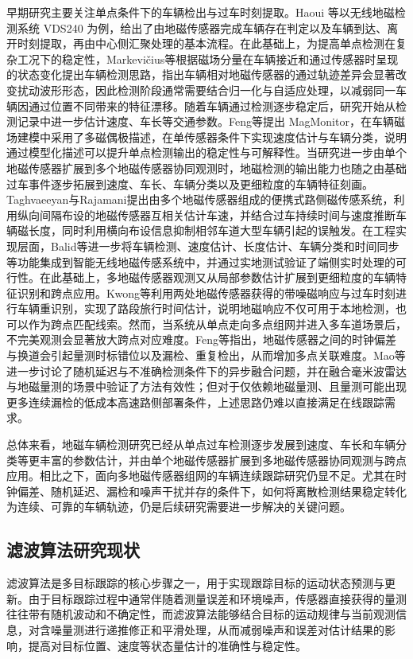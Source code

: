 \documentclass{xdupgthesis}
\begin{document}
早期研究主要关注单点条件下的车辆检出与过车时刻提取。Haoui 等以无线地磁检测系统 VDS240 为例，给出了由地磁传感器完成车辆存在判定以及车辆到达、离开时刻提取，再由中心侧汇聚处理的基本流程\cite{haoui2008wirelessmagnetic}。在此基础上，为提高单点检测在复杂工况下的稳定性，Markevičius等根据磁场分量在车辆接近和通过传感器时呈现的状态变化提出车辆检测思路，指出车辆相对地磁传感器的通过轨迹差异会显著改变扰动波形形态，因此检测阶段通常需要结合归一化与自适应处理，以减弱同一车辆因通过位置不同带来的特征漂移\cite{markevicius2016dynamic}。随着车辆通过检测逐步稳定后，研究开始从检测记录中进一步估计速度、车长等交通参数。Feng等提出 MagMonitor，在车辆磁场建模中采用了多磁偶极描述，在单传感器条件下实现速度估计与车辆分类，说明通过模型化描述可以提升单点检测输出的稳定性与可解释性\cite{feng2022magmonitor}。当研究进一步由单个地磁传感器扩展到多个地磁传感器协同观测时，地磁检测的输出能力也随之由基础过车事件逐步拓展到速度、车长、车辆分类以及更细粒度的车辆特征刻画。Taghvaeeyan与Rajamani提出由多个地磁传感器组成的便携式路侧磁传感系统，利用纵向间隔布设的地磁传感器互相关估计车速，并结合过车持续时间与速度推断车辆磁长度，同时利用横向布设信息抑制相邻车道大型车辆引起的误触发\cite{taghvaeeyan2014portable}。在工程实现层面，Balid等进一步将车辆检测、速度估计、长度估计、车辆分类和时间同步等功能集成到智能无线地磁传感系统中，并通过实地测试验证了端侧实时处理的可行性\cite{balid2018intelligent}。在此基础上，多地磁传感器观测又从局部参数估计扩展到更细粒度的车辆特征识别和跨点应用。Kwong等利用两处地磁传感器获得的带噪磁响应与过车时刻进行车辆重识别，实现了路段旅行时间估计，说明地磁响应不仅可用于本地检测，也可以作为跨点匹配线索\cite{kwong2009arterialtravel}。然而，当系统从单点走向多点组网并进入多车道场景后，不完美观测会显著放大跨点对应难度。Feng等指出，地磁传感器之间的时钟偏差与换道会引起量测时标错位以及漏检、重复检出，从而增加多点关联难度\cite{feng2021magneticdataassociation}。Mao等进一步讨论了随机延迟与不准确检测条件下的异步融合问题，并在融合毫米波雷达与地磁量测的场景中验证了方法有效性；但对于仅依赖地磁量测、且量测可能出现更多连续漏检的低成本高速路侧部署条件，上述思路仍难以直接满足在线跟踪需求\cite{mao2025asynchronousfusion}。 

总体来看，地磁车辆检测研究已经从单点过车检测逐步发展到速度、车长和车辆分类等更丰富的参数估计，并由单个地磁传感器扩展到多地磁传感器协同观测与跨点应用。相比之下，面向多地磁传感器组网的车辆连续跟踪研究仍显不足。尤其在时钟偏差、随机延迟、漏检和噪声干扰并存的条件下，如何将离散检测结果稳定转化为连续、可靠的车辆轨迹，仍是后续研究需要进一步解决的关键问题。

\subsection{滤波算法研究现状}
滤波算法是多目标跟踪的核心步骤之一，用于实现跟踪目标的运动状态预测与更新。由于目标跟踪过程中通常伴随着测量误差和环境噪声，传感器直接获得的量测往往带有随机波动和不确定性，而滤波算法能够结合目标的运动规律与当前观测信息，对含噪量测进行递推修正和平滑处理，从而减弱噪声和误差对估计结果的影响，提高对目标位置、速度等状态量估计的准确性与稳定性\cite{barshalomli1995multitarget}。
\end{document}
